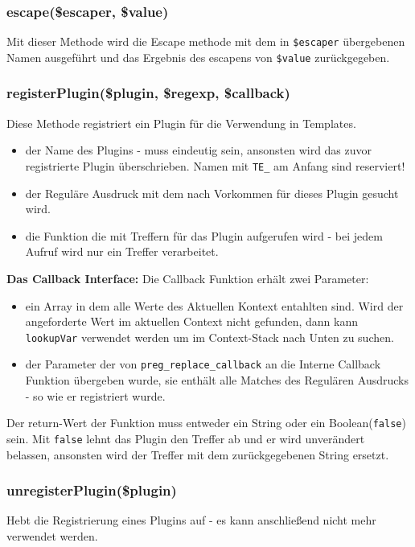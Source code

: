 \documentclass[a4paper,10pt]{article}
\begin{document}
\subsubsection{escape(\$escaper, \$value)}
Mit dieser Methode wird die Escape methode mit dem in {\tt \$escaper} \"ubergebenen Namen ausgef\"uhrt und das Ergebnis des escapens von {\tt \$value} zur\"uckgegeben.

\subsubsection{registerPlugin(\$plugin, \$regexp, \$callback)}
Diese Methode registriert ein Plugin f\"ur die Verwendung in Templates.
\begin{itemize}
  \item[\texttt{\$name}] der Name des Plugins - muss eindeutig sein, ansonsten wird das zuvor registrierte Plugin \"uberschrieben. Namen mit {\tt TE\_} am Anfang sind reserviert!
  \item[\texttt{\$regexp}] der Regul\"are Ausdruck mit dem nach Vorkommen f\"ur dieses Plugin gesucht wird.
  \item[\texttt{\$callback}] die Funktion die mit Treffern f\"ur das Plugin aufgerufen wird - bei jedem Aufruf wird nur ein Treffer verarbeitet.
\end{itemize}

{\bf Das Callback Interface:}\newline
Die Callback Funktion erh\"alt zwei Parameter:
\begin{itemize}
  \item[{\tt \$context}] ein Array in dem alle Werte des Aktuellen Kontext entahlten sind.
    Wird der angeforderte Wert im aktuellen Context nicht gefunden, dann kann {\tt lookupVar} verwendet werden um im Context-Stack nach Unten zu suchen.
  \item[{\tt \$match}] der Parameter der von {\tt preg\_replace\_callback} an die Interne Callback Funktion \"ubergeben wurde,
    sie enth\"alt alle Matches des Regul\"aren Ausdrucks - so wie er registriert wurde.
\end{itemize}
Der return-Wert der Funktion muss entweder ein String oder ein Boolean({\tt false}) sein. Mit {\tt false} lehnt das Plugin den Treffer ab und er wird unver\"andert belassen, ansonsten wird der Treffer mit dem zur\"uckgegebenen String ersetzt.

\subsubsection{unregisterPlugin(\$plugin)}
Hebt die Registrierung eines Plugins auf - es kann anschlie\ss{}end nicht mehr verwendet werden.
\end{document}
